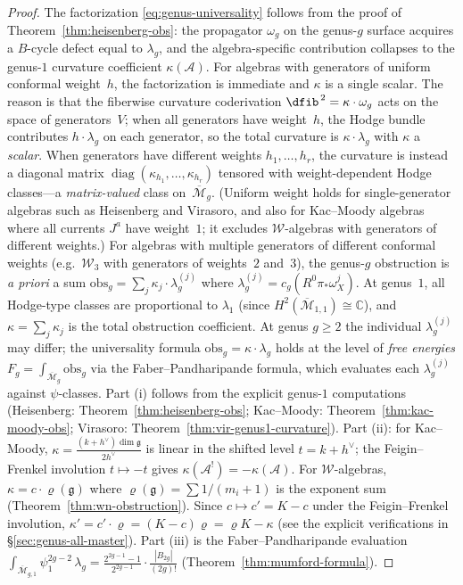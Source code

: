 \begin{proof}
The factorization \eqref{eq:genus-universality} follows from the proof of
Theorem~\ref{thm:heisenberg-obs}:
the propagator $\omega_g$ on the genus-$g$ surface acquires a $B$-cycle defect
equal to $\lambda_g$, and the algebra-specific contribution collapses to
the genus-$1$ curvature coefficient $\kappa(\mathcal{A})$.
For algebras with generators of uniform conformal weight~$h$, the
factorization is immediate and $\kappa$ is a single scalar.
The reason is that the fiberwise curvature coderivation
$\dfib^{\,2} = \kappa \cdot \omega_g$ acts on the space of generators~$V$;
when all generators have weight~$h$, the Hodge bundle contributes
$h \cdot \lambda_g$ on each generator, so the total curvature is
$\kappa \cdot \lambda_g$ with $\kappa$ a \emph{scalar}.
When generators have different weights $h_1, \ldots, h_r$, the curvature
is instead a diagonal matrix $\operatorname{diag}(\kappa_{h_1}, \ldots,
\kappa_{h_r})$ tensored with weight-dependent Hodge classes---a
\emph{matrix-valued} class on~$\overline{\mathcal{M}}_g$.
(Uniform weight holds for single-generator algebras such as
Heisenberg and Virasoro, and also for Kac--Moody algebras where all
currents $J^a$ have weight~$1$; it excludes $\mathcal{W}$-algebras
with generators of different weights.)
For algebras with multiple generators of different conformal weights
(e.g.\ $\mathcal{W}_3$ with generators of weights~$2$ and~$3$),
the genus-$g$ obstruction is \emph{a priori} a sum
$\mathrm{obs}_g = \sum_j \kappa_j \cdot \lambda_g^{(j)}$
where $\lambda_g^{(j)} = c_g(R^0\pi_* \omega_X^j)$.
At genus~$1$, all Hodge-type classes are proportional to $\lambda_1$
(since $H^2(\overline{\mathcal{M}}_{1,1}) \cong \mathbb{C}$), and
$\kappa = \sum_j \kappa_j$ is the total obstruction coefficient.
At genus $g \geq 2$ the individual $\lambda_g^{(j)}$ may differ;
the universality formula $\mathrm{obs}_g = \kappa \cdot \lambda_g$
holds at the level of \emph{free energies}
$F_g = \int_{\overline{\mathcal{M}}_g} \mathrm{obs}_g$
via the Faber--Pandharipande formula, which evaluates each
$\lambda_g^{(j)}$ against $\psi$-classes.
Part (i) follows from the explicit genus-$1$ computations
(Heisenberg: Theorem~\ref{thm:heisenberg-obs};
Kac--Moody: Theorem~\ref{thm:kac-moody-obs};
Virasoro: Theorem~\ref{thm:vir-genus1-curvature}).
Part (ii): for Kac--Moody, $\kappa = \frac{(k+h^\vee)\dim\mathfrak{g}}{2h^\vee}$
is linear in the shifted level $t = k + h^\vee$; the Feigin--Frenkel involution
$t \mapsto -t$ gives $\kappa(\mathcal{A}^!) = -\kappa(\mathcal{A})$.
For $\mathcal{W}$-algebras, $\kappa = c \cdot \varrho(\mathfrak{g})$ where
$\varrho(\mathfrak{g}) = \sum 1/(m_i+1)$ is the exponent sum
(Theorem~\ref{thm:wn-obstruction}).  Since $c \mapsto c' = K - c$
under the Feigin--Frenkel involution,
$\kappa' = c' \cdot \varrho = (K-c)\varrho = \varrho K - \kappa$
(see the explicit verifications in \S\ref{sec:genus-all-master}).
Part (iii) is the Faber--Pandharipande evaluation
$\int_{\overline{\mathcal{M}}_{g,1}} \psi_1^{2g-2}\,\lambda_g = \frac{2^{2g-1}-1}{2^{2g-1}} \cdot \frac{|B_{2g}|}{(2g)!}$
(Theorem~\ref{thm:mumford-formula}).
\end{proof}

